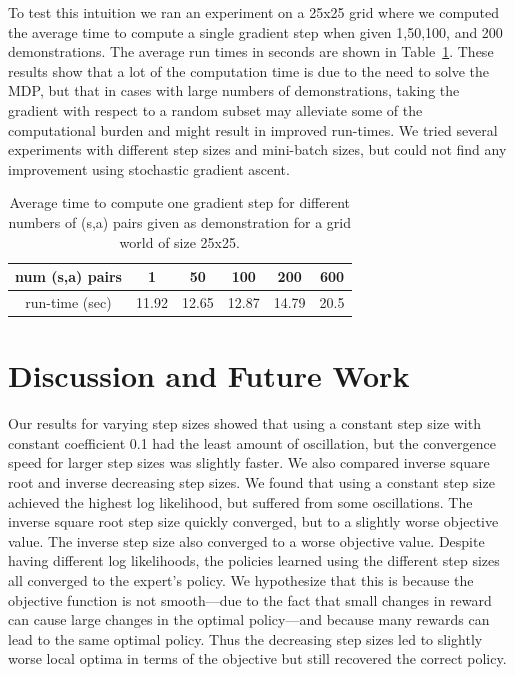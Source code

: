 \documentclass[10pt,a4paper]{article}
\begin{document}
To test this intuition we ran an experiment on a 25x25 grid where we computed the average time to compute a single gradient step when given 1,50,100, and 200 demonstrations. The average run times in seconds are shown in Table~\ref{tab:run_time_sgd}. These results show that a lot of the computation time is due to the need to solve the MDP, but that in cases with large numbers of demonstrations, taking the gradient with respect to a random subset may alleviate some of the computational burden and might result in improved run-times. We tried several experiments with different step sizes and mini-batch sizes, but could not find any improvement using stochastic gradient ascent.

\begin{table}
\centering
\begin{tabular}{|c|c|c|c|c|c|}
\hline 
num (s,a) pairs & 1 & 50 & 100 & 200 & 600\\ 
\hline
run-time (sec) & 11.92 & 12.65 & 12.87 & 14.79 & 20.5 \\ 
\hline 
\end{tabular}
\caption{Average time to compute one gradient step for different numbers of (s,a) pairs given as demonstration for a grid world of size 25x25.}
\label{tab:run_time_sgd}
\end{table}


\section{Discussion and Future Work}
Our results for varying step sizes showed that using a constant step size with constant coefficient 0.1 had the least amount of oscillation, but the convergence speed for larger step sizes was slightly faster. We also compared inverse square root and inverse decreasing step sizes. We found that using a constant step size achieved the highest log likelihood, but suffered from some oscillations. The inverse square root step size quickly converged, but to a slightly worse objective value. The inverse step size also converged to a worse objective value. Despite having different log likelihoods, the policies learned using the different step sizes all converged to the expert's policy. We hypothesize that this is because the objective function is not smooth---due to the fact that small changes in reward can cause large changes in the optimal policy---and because many rewards can lead to the same optimal policy. Thus the decreasing step sizes led to slightly worse local optima in terms of the objective but still recovered the correct policy.
\end{document}
